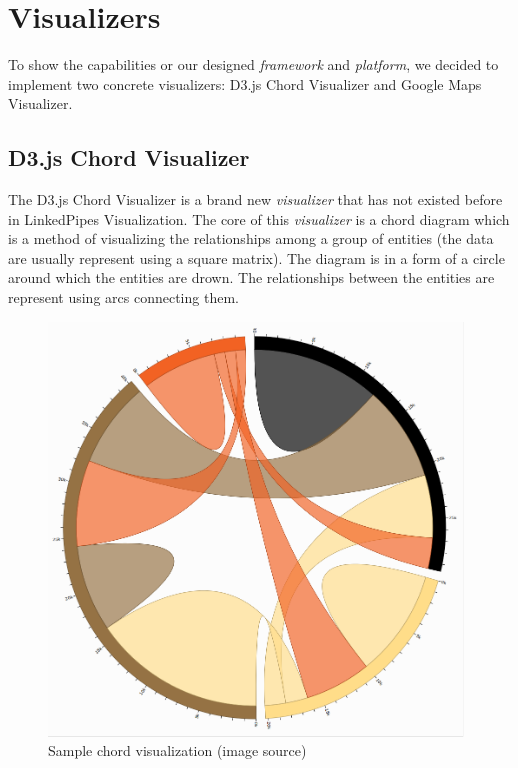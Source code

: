 \chapter{Visualizers}

To show the capabilities or our designed \emph{framework} and \emph{platform}, we decided to implement two concrete visualizers: D3.js Chord Visualizer and Google Maps Visualizer.

\section{D3.js Chord Visualizer}
\label{sec:visualizers:chord}

The D3.js Chord Visualizer is a brand new \emph{visualizer} that has not existed before in LinkedPipes Visualization. The core of this \emph{visualizer} is a chord diagram which is a method of visualizing the relationships among a group of entities (the data are usually represent using a square matrix). The diagram is in a form of a circle around which the entities are drown. The relationships between the entities are represent using arcs connecting them.

\begin{figure}
	\centering
	\includegraphics[width=110mm]{img/06_chord_example.png}
	\caption[Sample chord visualization]{Sample chord visualization (image source\footnotemark)  }
	\label{fig:chord-example}
\end{figure}


